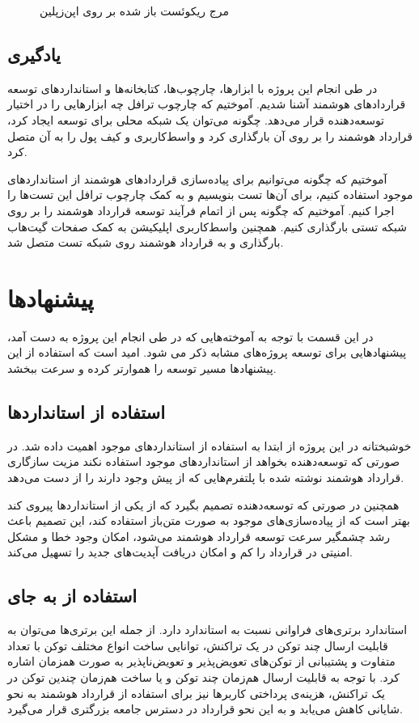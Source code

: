 \begin{figure}[H]
\centerline{}
\caption{مرج ریکوئست باز شده بر روی اپن‌زپلین}
\label{fig:oz-mergereq}
\end{figure}


\subsection{یادگیری}
در طی انجام این پروژه با ابزارها، چارچوب‌ها، کتابخانه‌ها و استانداردهای توسعه قراردادهای هوشمند آشنا شدیم.
آموختیم که چارچوب ترافل چه ابزارهایی را در اختیار توسعه‌دهنده قرار می‌دهد.
چگونه می‌توان یک شبکه محلی برای توسعه ایجاد کرد،
قرارداد هوشمند را بر روی آن بارگذاری کرد و واسط‌کاربری و کیف پول را به آن متصل کرد.

آموختیم که چگونه می‌توانیم برای پیاده‌سازی قراردادهای هوشمند از استانداردهای موجود استفاده کنیم،
برای آن‌ها تست بنویسیم و به کمک چارچوب ترافل این تست‌ها را اجرا کنیم.
آموختیم که چگونه پس از اتمام فرآیند توسعه قرارداد هوشمند را بر روی شبکه تستی بارگذاری کنیم.
همچنین واسط‌کاربری اپلیکیشن به کمک صفحات گیت‌هاب بارگذاری و به قرارداد هوشمند روی شبکه تست متصل شد.


\section{پیشنهادها}
در این قسمت با توجه به آموخته‌هایی که در طی انجام این پروژه به دست آمد،
پیشنهادهایی برای توسعه پروژه‌های مشابه ذکر می شود.
امید است که استفاده از این پیشنهادها مسیر توسعه را هموارتر کرده و سرعت ببخشد.

\subsection{استفاده از استانداردها}
خوشبختانه در این پروژه از ابتدا به استفاده از استانداردهای موجود اهمیت داده شد.
در صورتی که توسعه‌دهنده بخواهد از استانداردهای موجود استفاده نکند مزیت سازگاری
قرارداد هوشمند نوشته شده با پلتفرم‌هایی که از پیش وجود دارند را از دست می‌دهد.

همچنین در صورتی که توسعه‌دهنده تصمیم بگیرد که از یکی از استانداردها پیروی کند
بهتر است که از پیاده‌سازی‌های موجود به صورت متن‌باز استفاده کند، این تصمیم باعث
رشد چشمگیر سرعت توسعه قرارداد هوشمند می‌شود، امکان وجود خطا و مشکل امنیتی در قرارداد را کم
و امکان دریافت آپدیت‌های جدید را تسهیل می‌کند.


\subsection{استفاده از  به جای }
استاندارد
برتری‌های فراوانی نسبت به استاندارد
دارد.
از جمله این برتری‌ها می‌توان به قابلیت ارسال چند توکن در یک تراکنش،
توانایی ساخت انواع مختلف توکن با تعداد متفاوت و
پشتیبانی از توکن‌های تعویض‌پذیر و تعویض‌ناپذیر به صورت همزمان اشاره کرد.
با توجه به قابلیت ارسال هم‌زمان چند توکن و یا ساخت هم‌زمان چندین توکن در یک تراکنش،
هزینه‌ی پرداختی کاربرها نیز
برای استفاده از قرارداد هوشمند به نحو شایانی کاهش می‌یابد و به این نحو قرارداد در دسترس
جامعه بزرگتری قرار می‌گیرد.

